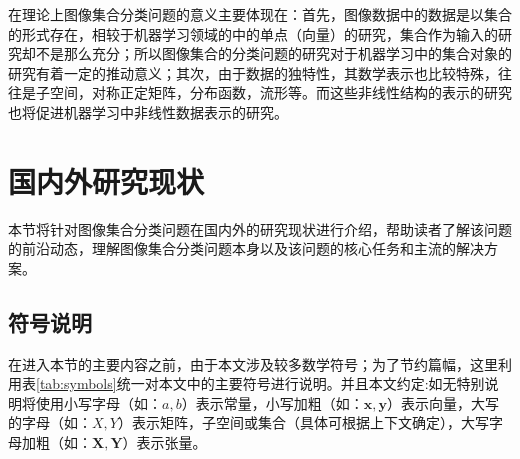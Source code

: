 在理论上图像集合分类问题的意义主要体现在：首先，图像数据中的数据是以集合的形式存在，相较于机器学习领域的中的单点（向量）的研究，集合作为输入的研究却不是那么充分；所以图像集合的分类问题的研究对于机器学习中的集合对象的研究有着一定的推动意义；其次，由于数据的独特性，其数学表示也比较特殊，往往是子空间，对称正定矩阵，分布函数，流形等。而这些非线性结构的表示的研究也将促进机器学习中非线性数据表示的研究。
\section{国内外研究现状}
\label{sec:current}
本节将针对图像集合分类问题在国内外的研究现状进行介绍，帮助读者了解该问题的前沿动态，理解图像集合分类问题本身以及该问题的核心任务和主流的解决方案。
\subsection{符号说明}
\label{sec:symbols}
在进入本节的主要内容之前，由于本文涉及较多数学符号；为了节约篇幅，这里利用表\ref{tab:symbols}统一对本文中的主要符号进行说明。并且本文约定:如无特别说明将使用小写字母（如：$a,b$）表示常量，小写加粗（如：$\bm{x},\bm{y}$）表示向量，大写的字母（如：$X,Y$）表示矩阵，子空间或集合（具体可根据上下文确定），大写字母加粗（如：$\bm{X},\bm{Y}$）表示张量。
